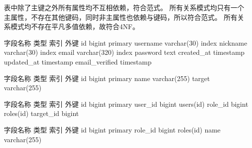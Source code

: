 {}\markdownRendererInterblockSeparator
{}表中除了主键之外所有属性均不互相依赖，符合范式。\markdownRendererInterblockSeparator
{}\markdownRendererInterblockSeparator
{}所有关系模式均只有一个主属性，不存在其他键码，同时非主属性也依赖与键码，所以符合范式。\markdownRendererInterblockSeparator
{}\markdownRendererInterblockSeparator
{}所有关系模式均不存在平凡多值依赖，故符合4NF。\markdownRendererInterblockSeparator
{}\markdownRendererInterblockSeparator
{}\markdownRendererInterblockSeparator
{}\begin{center}\markdownRendererInterblockSeparator
{}%
{{字段名称}%
{类型}%
{索引}%
{外键}%
}%
{{id}%
{bigint}%
{primary}%
{}%
}%
{{username}%
{varchar(30)}%
{index}%
{}%
}%
{{nickname}%
{varchar(30)}%
{index}%
{}%
}%
{{email}%
{varchar(320)}%
{index}%
{}%
}%
{{password}%
{text}%
{}%
{}%
}%
{{created\_at}%
{timestamp}%
{}%
{}%
}%
{{updated\_at}%
{timestamp}%
{}%
{}%
}%
{{email\_verified}%
{timestamp}%
{}%
{}%
}%
\markdownRendererInterblockSeparator
{}\end{center}\markdownRendererInterblockSeparator
{}\markdownRendererInterblockSeparator
{}\begin{center}\markdownRendererInterblockSeparator
{}%
{{字段名称}%
{类型}%
{索引}%
{外键}%
}%
{{id}%
{bigint}%
{primary}%
{}%
}%
{{name}%
{varchar(255)}%
{}%
{}%
}%
{{target}%
{varchar(255)}%
{}%
{}%
}%
\markdownRendererInterblockSeparator
{}\end{center}\markdownRendererInterblockSeparator
{}\markdownRendererInterblockSeparator
{}\begin{center}\markdownRendererInterblockSeparator
{}%
{{字段名称}%
{类型}%
{索引}%
{外键}%
}%
{{id}%
{bigint}%
{primary}%
{}%
}%
{{user\_id}%
{bigint}%
{}%
{users(id)}%
}%
{{role\_id}%
{bigint}%
{}%
{roles(id)}%
}%
{{target\_id}%
{bigint}%
{}%
{}%
}%
\markdownRendererInterblockSeparator
{}\end{center}\markdownRendererInterblockSeparator
{}\markdownRendererInterblockSeparator
{}\begin{center}\markdownRendererInterblockSeparator
{}%
{{字段名称}%
{类型}%
{索引}%
{外键}%
}%
{{id}%
{bigint}%
{primary}%
{}%
}%
{{role\_id}%
{bigint}%
{}%
{roles(id)}%
}%
{{name}%
{varchar(255)}%
{}%
{}%
}%
\markdownRendererInterblockSeparator
{}\end{center}\relax
